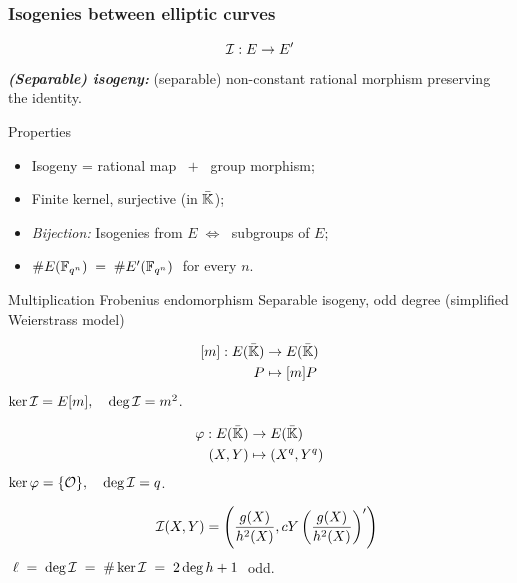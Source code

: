 \documentclass[10pt,usepdftitle=false]{beamer}
\begin{document}

\begin{frame}
  \frametitle{Isogenies between elliptic curves}
  
  \vspace{-2mm}

  {\large \[\mathcal{I}:E\to E'\]} 
  \emph{\textbf{(Separable) isogeny:}} (separable)
  non-constant rational morphism preserving the identity.
  
  \begin{block}{Properties}
    \begin{itemize}
    \item Isogeny = rational map $\;+\;$ group morphism;
    \item Finite kernel, surjective (in $\bar{\mathbb{K}}$);
    \item \emph{Bijection:} Isogenies from
      $E\;\Leftrightarrow\;$ subgroups of $E$;
    \item $\# E(\mathbb{F}_{q^n}) \;=\; \# E'(\mathbb{F}_{q^n})\;$ for every $n$.
    \end{itemize}
  \end{block}

  \vspace{-1mm}

  \begin{block}{
	\begin{overprint}
	 Multiplication	
	\onslide<2> Frobenius endomorphism
	\onslide<3> Separable isogeny, odd degree (simplified Weierstrass model)
	\end{overprint}
      }
    \begin{overprint}
      \[\begin{aligned}
	{}[m] : E(\bar{\mathbb{K}}) &\rightarrow E(\bar{\mathbb{K}})\\
	                   P &\mapsto [m]P
      \end{aligned}\]
      $\ker\mathcal{I} = E[m], \quad\deg\mathcal{I} = m^2$.

      \[\begin{aligned}
	\varphi : E(\bar{\mathbb{K}}) &\rightarrow E(\bar{\mathbb{K}})\\
	               (X,Y) &\mapsto (X^q,Y^q)
      \end{aligned}\]
      $\ker\varphi = \{\mathcal{O}\}, \quad\deg\mathcal{I} = q$.

      \[\quad\mathcal{I}(X,Y) = \left(\frac{g(X)}{h^2(X)},
      cY\left(\frac{g(X)}{h^2(X)}\right)'\right)\]
      $\;\ell\;=\;\deg\mathcal{I}\;=\;
      \# \ker\mathcal{I} \;=\; 2\deg h + 1\;$ odd.
    \end{overprint}
  \end{block}  
\end{frame}
\end{document}
